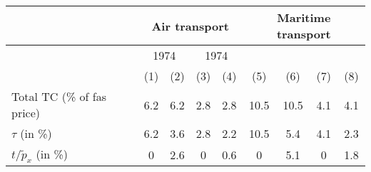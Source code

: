 \begin{tabular}{l|cc|cc|cc|cc}
& \multicolumn{4}{|c|}{Air transport} & \multicolumn{4}{|c}{Maritime transport} \\ \hline
& \multicolumn{2}{|c|}{1974} & \multicolumn{2}{c}{1974} \\
& (1) & (2) &  (3) & (4) & (5) & (6) &  (7) & (8)\\ \hline
Total TC (\% of fas price) & 6.2 & 6.2 & 2.8 & 2.8 & 10.5 & 10.5 & 4.1 & 4.1 \\
$\tau$ (in \%) & 6.2 & 3.6 & 2.8 & 2.2 & 10.5 & 5.4 & 4.1 & 2.3\\
$t/\widetilde{p}_x$ (in \%) & 0 & 2.6 & 0 & 0.6 & 0 & 5.1 & 0 & 1.8\\ 
\hline \hline
\end{tabular} 